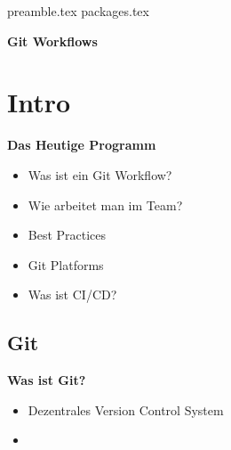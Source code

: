 \RequirePackage{import}
{preamble.tex}
{packages.tex}

    \begin{frame}[c]
        \centering
        \Large
        \textbf{Git Workflows}
    \end{frame}

    \section{Intro}\label{sec:intro}
    \begin{frame}[c]
        \slidehead
        \vspace{-1em}
        \centering
        \large
        \textbf{Das Heutige Programm}
        \vspace{2em}
        \begin{itemize}[<+->]
            \item Was ist ein Git Workflow?
            \item Wie arbeitet man im Team?
            \item Best Practices
            \item Git Platforms
            \item Was ist CI/CD?
        \end{itemize}
    \end{frame}

    \subsection{Git}
    \begin{frame}[c]
        \slidehead
        \vspace{-1em}
        \centering
        \large
        \textbf{Was ist Git?}
        \vspace{2em}
        \begin{itemize}[<+->]
            \item Dezentrales Version Control System
            \item
        \end{itemize}
    \end{frame}

